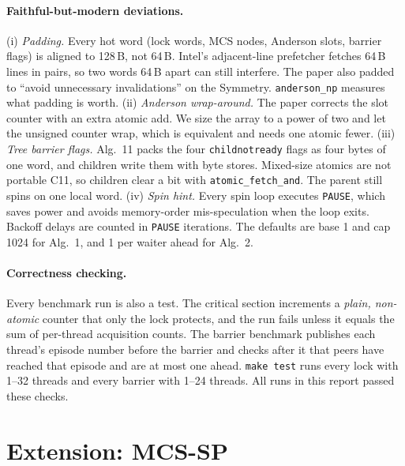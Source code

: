 \documentclass[10pt,twocolumn]{article}
\newcommand{\mcssp}{\textsc{MCS-SP}}
\begin{document}
\paragraph{Faithful-but-modern deviations.}
(i) \emph{Padding.} Every hot word (lock words, MCS nodes, Anderson slots, barrier flags) is aligned to
128\,B, not 64\,B. Intel's adjacent-line prefetcher fetches 64\,B lines in pairs, so two words 64\,B apart
can still interfere. The paper also padded to ``avoid unnecessary invalidations'' on the Symmetry. \texttt{anderson\_np} measures what
padding is worth.
(ii) \emph{Anderson wrap-around.} The paper corrects the slot counter with an extra atomic add. We size the
array to a power of two and let the unsigned counter wrap, which is equivalent and needs one atomic fewer.
(iii) \emph{Tree barrier flags.} Alg.~11 packs the four \texttt{childnotready} flags as four bytes of one word,
and children write them with byte stores. Mixed-size atomics are not portable C11, so children clear a
bit with \texttt{atomic\_fetch\_and}. The parent still spins on one local word.
(iv) \emph{Spin hint.} Every spin loop executes \texttt{PAUSE}, which saves power and avoids memory-order
mis-speculation when the loop exits. Backoff delays are counted in \texttt{PAUSE} iterations. The defaults
are base 1 and cap 1024 for Alg.~1, and 1 per waiter ahead for Alg.~2.

\paragraph{Correctness checking.} Every benchmark run is also a test. The critical section
increments a \emph{plain, non-atomic} counter that only the lock protects, and the run fails unless
it equals the sum of per-thread acquisition counts. The barrier benchmark publishes each thread's episode
number before the barrier and checks after it that peers have reached that episode and are at most one
ahead. \texttt{make test} runs every lock with 1--32 threads and every barrier with 1--24 threads.
All runs in this report passed these checks.

\section{Extension: \mcssp{}}
\label{sec:ext}
\end{document}
